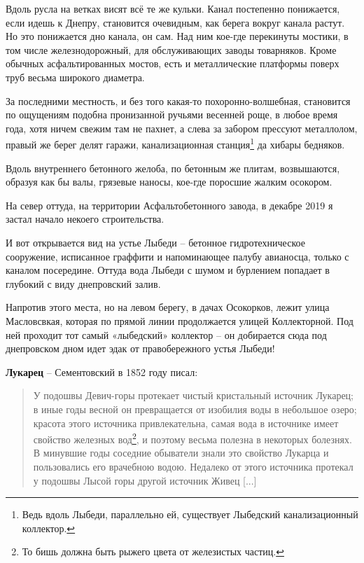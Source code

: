 Вдоль русла на ветках висят всё те же кульки. Канал постепенно понижается, если идешь к Днепру, становится очевидным, как берега вокруг канала растут. Но это понижается дно канала, он сам. Над ним кое-где перекинуты мостики, в том числе железнодорожный, для обслуживающих заводы товарняков. Кроме обычных асфальтированных мостов, есть и металлические платформы поверх труб весьма широкого диаметра.

За последними местность, и без того какая-то похоронно-волшебная, становится по ощущениям подобна пронизанной ручьями весенней роще, в любое время года, хотя ничем свежим там не пахнет, а слева за забором прессуют металлолом, правый же берег делят гаражи, канализационная станция\footnote{Ведь вдоль Лыбеди, параллельно ей, существует Лыбедский канализационный коллектор.} да хибары бедняков.

Вдоль внутреннего бетонного желоба, по бетонным же плитам, возвышаются, образуя как бы валы, грязевые наносы, кое-где поросшие жалким осокором.

На север оттуда, на территории Асфальтобетонного завода, в декабре 2019 я застал начало некоего строительства.

И вот открывается вид на устье Лыбеди – бетонное гидротехническое сооружение, исписанное граффити и напоминающее палубу авианосца, только с каналом посередине. Оттуда вода Лыбеди с шумом и бурлением попадает в глубокий с виду днепровский залив.

Напротив этого места, но на левом берегу, в дачах Осокорков, лежит улица Масловсвкая, которая по прямой линии продолжается улицей Коллекторной. Под ней проходит тот самый «лыбедский» коллектор – он добирается сюда под днепровском дном идет эдак от правобережного устья Лыбеди!\\

\medskip

\textbf{Лукарец} – Сементовский в 1852 году писал:

\begin{quotation}
У подошвы Девич-горы протекает чистый кристальный источник Лукарец; в иные годы весной он превращается от изобилия воды в небольшое озеро; красота этого источника привлекательна, самая вода в источнике имеет свойство железных вод\footnote{То бишь должна быть рыжего цвета от железистых частиц.}, и поэтому весьма полезна в некоторых болезнях. В минувшие годы соседние обыватели знали это свойство Лукарца и пользовались его врачебною водою. Недалеко от этого источника протекал у подошвы Лысой горы другой источник Живец [...]
\end{quotation}

